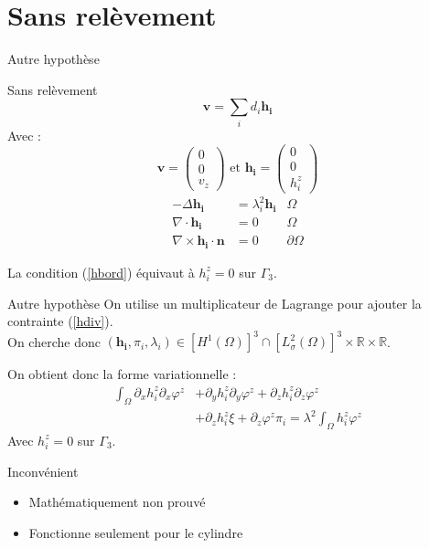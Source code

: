 \documentclass{beamer}
\newcommand{\laplace}{{\Delta}}
\newcommand{\rot}{{\nabla\times}}
\renewcommand{\div}{{\nabla\cdot}}
\begin{document}
\section{Sans relèvement}
\begin{frame}{Autre hypothèse}
\begin{alertblock}{Sans relèvement}
\[\bm{v}=\sum_i d_i\bm{h_i}\]
Avec :
\[
\bm{v}=\begin{pmatrix}
0\\0\\v_z
\end{pmatrix}
\text{ et }\bm{h_i}=\begin{pmatrix}
0\\0\\h_i^z
\end{pmatrix}
\]
\begin{align}
-\laplace\bm{h_i}&=\lambda_i^2\bm{h_i} & \Omega\\
\div\bm{h_i}&=0 & \Omega\label{hdiv}\\
\rot\bm{h_i}\cdot\bm{n}&=0 & \partial\Omega \label{hbord}
\end{align}
\end{alertblock}
La condition (\ref{hbord}) équivaut à $h_i^z=0$ sur $\Gamma_3$.
\end{frame}

\begin{frame}{Autre hypothèse}
On utilise un multiplicateur de Lagrange pour ajouter la contrainte (\ref{hdiv}).\\
On cherche donc $(\bm{h_i},\pi_i,\lambda_i)\in [H^1(\Omega)]^3\cap [L^2_\sigma(\Omega)]^3 \times \mathbb{R} \times \mathbb{R}$.
\begin{block}{On obtient donc la forme variationnelle :}
\begin{align*}
\int_\Omega \partial_xh_i^z\partial_x\varphi^z &+ \partial_yh_i^z\partial_y\varphi^z + \partial_zh_i^z\partial_z\varphi^z\\
&+ \partial_z h_i^z\xi + \partial_z\varphi^z\pi_i = \lambda^2\int_\Omega h_i^z\varphi^z
\end{align*}
Avec $h_i^z=0$ sur $\Gamma_3$.
\end{block}
\begin{alertblock}{Inconvénient}
\begin{itemize}
\item Mathématiquement non prouvé
\item Fonctionne seulement pour le cylindre
\end{itemize}
\end{alertblock}
\end{frame}
\end{document}
